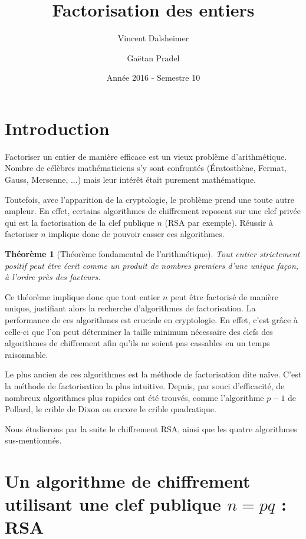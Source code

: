 \documentclass[french, 12pt, titlepage]{article}
\newtheorem{theoreme}{Th{\'e}or{\`e}me}
\begin{document}
\title{Factorisation des entiers}
\author{Vincent Dalsheimer \and
	Gaëtan Pradel}
\date{Année 2016 - Semestre 10}
\maketitle
\tableofcontents

\newpage
\section{Introduction}


Factoriser un entier de manière efficace est un vieux problème d'arithmétique. Nombre de célèbres mathématiciens s'y sont confrontés
({\'E}ratosthène, Fermat, Gauss, Mersenne, ...) mais leur intérêt était purement mathématique.

Toutefois, avec l'apparition de la cryptologie, le
problème prend une toute autre ampleur. En effet, certains algorithmes
de chiffrement reposent sur une clef privée qui est la factorisation de
la clef publique $n$ (RSA par exemple). Réussir à factoriser $n$ implique donc de pouvoir casser ces algorithmes.

\begin{theoreme}[Théorème fondamental de l'arithmétique]
  Tout entier strictement positif peut être écrit comme un produit de nombres premiers d'une unique façon, à l'ordre près des facteurs.
\end{theoreme}

Ce théorème implique donc que tout entier $n$ peut être factorisé de manière unique, justifiant alors la recherche d'algorithmes de factorisation.
La performance de ces algorithmes est cruciale en cryptologie. En effet, c'est grâce à celle-ci que l'on peut déterminer la taille minimum nécessaire des clefs des algorithmes de chiffrement afin qu'ils ne soient pas
cassables en un temps raisonnable.

Le plus ancien de ces algorithmes est la méthode de factorisation dite naïve. C'est la méthode de factorisation la plus intuitive. Depuis, par souci d'efficacité, de nombreux
algorithmes plus rapides ont été trouvés, comme l'algorithme $p - 1$ de Pollard, le crible de Dixon ou encore le crible quadratique.

Nous étudierons par la suite le chiffrement RSA, ainsi que les quatre algorithmes sus-mentionnés.


\section{Un algorithme de chiffrement utilisant une clef publique $n = pq$ : RSA}
\end{document}
